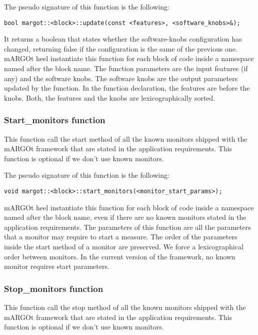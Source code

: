 The pseudo signature of this function is the following:
\begin{lstlisting}
bool margot::<block>::update(const <features>, <software_knobs>&);
\end{lstlisting}
It returns a boolean that states whether the software-knobs configuration has changed, returning false if the configuration is the same of the previous one.
mARGOt heel instantiate this function for each block of code inside a namespace named after the block name.
The function parameters are the input features (if any) and the software knobs.
The software knobs are the output parameters updated by the function.
In the function declaration, the features are before the knobs.
Both, the features and the knobs are lexicographically sorted.



\subsubsection*{Start\_monitors function}

This function call the start method of all the known monitors shipped with the mARGOt framework that are stated in the application requirements.
This function is optional if we don't use known monitors.

The pseudo signature of this function is the following:
\begin{lstlisting}
void margot::<block>::start_monitors(<monitor_start_params>);
\end{lstlisting}
mARGOt heel instantiate this function for each block of code inside a namespace named after the block name, even if there are no known monitors stated in the application requirements.
The parameters of this function are all the parameters that a monitor may require to start a measure.
The order of the parameters inside the start method of a monitor are preserved.
We force a lexicographical order between monitors.
In the current version of the framework, no known monitor requires start parameters.


\subsubsection*{Stop\_monitors function}

This function call the stop method of all the known monitors shipped with the mARGOt framework that are stated in the application requirements.
This function is optional if we don't use known monitors.

